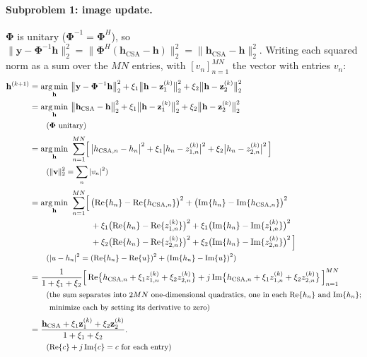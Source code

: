 \documentclass[11pt,a4paper]{article}
\DeclareMathOperator*{\argmin}{arg\,min}
\newcommand{\x}{\mathbf h}
\newcommand{\y}{\mathbf y}
\newcommand{\zo}{\mathbf z_1}
\newcommand{\zt}{\mathbf z_2}
\newcommand{\bPhi}{\boldsymbol\Phi}
\begin{document}
\paragraph{Subproblem 1: image update.} $\bPhi$ is unitary ($\bPhi^{-1} = \bPhi^H$), so $\lVert \y - \bPhi^{-1}\x \rVert_2^2 = \lVert \bPhi^H(\x_{\mathrm{CSA}} - \x) \rVert_2^2 = \lVert \x_{\mathrm{CSA}} - \x \rVert_2^2$.
Writing each squared norm as a sum over the $MN$ entries, with $[v_n]_{n=1}^{MN}$ the vector with entries $v_n$:
\begin{align}
  \x^{(k+1)}
  &= \argmin_{\x}\ \bigl\lVert \y - \bPhi^{-1}\x \bigr\rVert_2^2
     + \xi_1 \bigl\lVert \x - \zo^{(k)} \bigr\rVert_2^2 + \xi_2 \bigl\lVert \x - \zt^{(k)} \bigr\rVert_2^2 \notag \\
  &= \argmin_{\x}\ \bigl\lVert \x_{\mathrm{CSA}} - \x \bigr\rVert_2^2
     + \xi_1 \bigl\lVert \x - \zo^{(k)} \bigr\rVert_2^2 + \xi_2 \bigl\lVert \x - \zt^{(k)} \bigr\rVert_2^2 \notag \\
  &\qquad \text{\small($\bPhi$ unitary)} \notag \\[2pt]
  &= \argmin_{\x}\ \sum_{n=1}^{MN} \Bigl[\, \bigl|h_{\mathrm{CSA},n} - h_n\bigr|^2 + \xi_1 \bigl|h_n - z^{(k)}_{1,n}\bigr|^2 + \xi_2 \bigl|h_n - z^{(k)}_{2,n}\bigr|^2 \,\Bigr] \notag \\
  &\qquad \text{\small($\lVert\mathbf v\rVert_2^2 = \sum_n |v_n|^2$)} \notag \\[2pt]
  &= \argmin_{\x}\ \sum_{n=1}^{MN} \Bigl[\, \bigl(\mathrm{Re}\{h_n\} - \mathrm{Re}\{h_{\mathrm{CSA},n}\}\bigr)^2
       + \bigl(\mathrm{Im}\{h_n\} - \mathrm{Im}\{h_{\mathrm{CSA},n}\}\bigr)^2 \notag \\
  &\hphantom{{}= \argmin_{\x}\ \sum_{n=1}^{MN} \Bigl[\,}
       + \xi_1 \bigl(\mathrm{Re}\{h_n\} - \mathrm{Re}\{z^{(k)}_{1,n}\}\bigr)^2
       + \xi_1 \bigl(\mathrm{Im}\{h_n\} - \mathrm{Im}\{z^{(k)}_{1,n}\}\bigr)^2 \notag \\
  &\hphantom{{}= \argmin_{\x}\ \sum_{n=1}^{MN} \Bigl[\,}
       + \xi_2 \bigl(\mathrm{Re}\{h_n\} - \mathrm{Re}\{z^{(k)}_{2,n}\}\bigr)^2
       + \xi_2 \bigl(\mathrm{Im}\{h_n\} - \mathrm{Im}\{z^{(k)}_{2,n}\}\bigr)^2 \,\Bigr] \notag \\
  &\qquad \text{\small($|u - h_n|^2 = (\mathrm{Re}\{h_n\} - \mathrm{Re}\{u\})^2 + (\mathrm{Im}\{h_n\} - \mathrm{Im}\{u\})^2$)} \notag \\[2pt]
  &= \frac{1}{1+\xi_1+\xi_2} \Bigl[\, \mathrm{Re}\bigl\{h_{\mathrm{CSA},n} + \xi_1 z^{(k)}_{1,n} + \xi_2 z^{(k)}_{2,n}\bigr\}
       + j\, \mathrm{Im}\bigl\{h_{\mathrm{CSA},n} + \xi_1 z^{(k)}_{1,n} + \xi_2 z^{(k)}_{2,n}\bigr\} \,\Bigr]_{n=1}^{MN} \notag \\
  &\qquad \text{\small(the sum separates into $2MN$ one-dimensional quadratics, one in each $\mathrm{Re}\{h_n\}$ and $\mathrm{Im}\{h_n\}$;} \notag \\
  &\qquad \text{\small\phantom{(}minimize each by setting its derivative to zero)} \notag \\[2pt]
  &= \frac{\x_{\mathrm{CSA}} + \xi_1\zo^{(k)} + \xi_2\zt^{(k)}}{1+\xi_1+\xi_2} . \label{eq:xsol} \\
  &\qquad \text{\small($\mathrm{Re}\{c\} + j\,\mathrm{Im}\{c\} = c$ for each entry)} \notag
\end{align}
\end{document}
